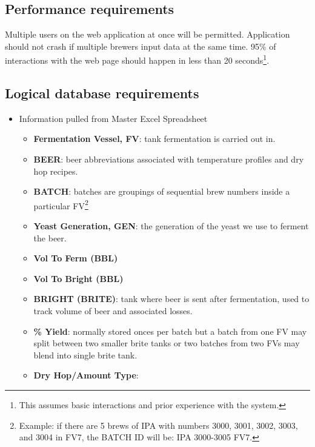 \documentclass[draftclsnofoot,onecolumn,letterpaper,10pt,compsoc]{IEEEtran}
\begin{document}
	\subsection{Performance requirements}
		Multiple users on the web application at once will be permitted.
        Application should not crash if multiple brewers input data at the same time.
		95\% of interactions with the web page should happen in less than 20 seconds\footnote{This assumes basic interactions and prior experience with the system.}.

	\subsection{Logical database requirements}
    \begin{itemize}
        \item{Information pulled from Master Excel Spreadsheet}
            \begin{itemize}
                \item{\textbf{Fermentation Vessel, FV}:
                    tank fermentation is carried out in.
                }
                \item{\textbf{BEER}:
                    beer abbreviations associated with temperature profiles and dry hop recipes.
                }
                \item{\textbf{BATCH}:
                    batches are groupings of sequential brew numbers inside a particular FV\footnote{Example: if there are 5 brews of IPA with numbers 3000, 3001, 3002, 3003, and 3004 in FV7, the BATCH ID will be: IPA 3000-3005 FV7.}
                }
                \item{\textbf{Yeast Generation, GEN}:
				    the generation of the yeast we use to ferment the beer.
                }
                \item{\textbf{Vol To Ferm (BBL)}}
                \item{\textbf{Vol To Bright (BBL)}}
                \item{\textbf{BRIGHT (BRITE)}:
                    tank where beer is sent after fermentation, used to track volume of beer and associated losses.
                }
                \item{\textbf{\% Yield}:
                    normally stored onces per batch but a batch from one FV may split between two smaller brite tanks or two batches from two FVs may blend into single brite tank.
                }
                \item{\textbf{Dry Hop/Amount Type}:
}
\end{itemize}
\end{itemize}
\end{document}
